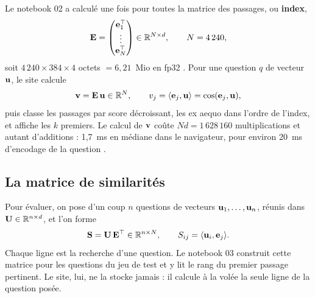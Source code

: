 Le notebook 02 a calculé une fois pour toutes la matrice des passages, ou \textbf{index},
\[
  \mathbf{E} = \begin{pmatrix} \mathbf{e}_1^{\top} \\ \vdots \\ \mathbf{e}_N^{\top} \end{pmatrix} \in \mathbb{R}^{N \times d},
  \qquad N = 4\,240 ,
\]
soit $4\,240 \times 384 \times 4$ octets $= 6{,}21$~Mio en fp32 \mesure. Pour une question $q$ de vecteur $\mathbf{u}$,
le site calcule
\[
  \mathbf{v} = \mathbf{E}\,\mathbf{u} \in \mathbb{R}^{N}, \qquad v_j = \langle \mathbf{e}_j, \mathbf{u} \rangle = \cos(\mathbf{e}_j, \mathbf{u}),
\]
puis classe les passages par score décroissant, les ex aequo dans l'ordre de l'index, et affiche les $k$ premiers.
Le calcul de $\mathbf{v}$ coûte $N d = 1\,628\,160$ multiplications et autant d'additions : 1,7~ms en médiane dans
le navigateur, pour environ 20~ms d'encodage de la question \mesure.

\begin{center}
\end{center}

\subsection{La matrice de similarités}

Pour évaluer, on pose d'un coup $n$ questions de vecteurs $\mathbf{u}_1, \dots, \mathbf{u}_n$, réunis dans
$\mathbf{U} \in \mathbb{R}^{n \times d}$, et l'on forme
\[
  \mathbf{S} = \mathbf{U}\,\mathbf{E}^{\top} \in \mathbb{R}^{n \times N}, \qquad S_{ij} = \langle \mathbf{u}_i, \mathbf{e}_j \rangle .
\]
Chaque ligne est la recherche d'une question. Le notebook 03 construit cette matrice pour les questions du jeu de
test et y lit le rang du premier passage pertinent. Le site, lui, ne la stocke jamais : il calcule à la volée la
seule ligne de la question posée.

